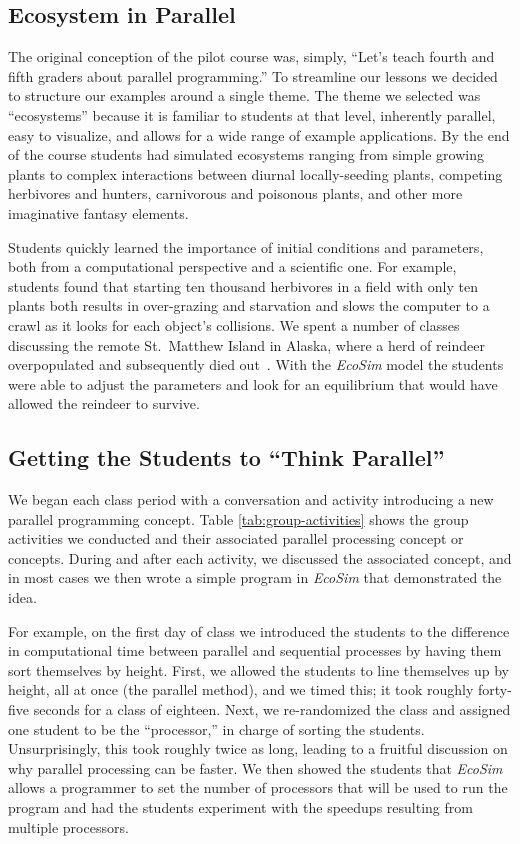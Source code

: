 \documentclass{sig-alternate}
\begin{document}
\subsection{Ecosystem in Parallel}
The original conception of the pilot course was, simply, 
``Let's teach fourth and fifth graders about parallel programming.''
To streamline our lessons we decided to structure our examples around a single theme.
The theme we selected was ``ecosystems'' because
it is familiar to students at that level,
inherently parallel, 
easy to visualize, 
and allows for a wide range of example applications.
By the end of the course students had simulated ecosystems
ranging from simple growing plants to complex interactions between 
diurnal locally-seeding plants, competing herbivores and hunters, 
carnivorous and poisonous plants, and other more imaginative fantasy elements.

Students quickly learned the importance of initial conditions and parameters, both from a 
computational perspective and a scientific one.  
For example, students found that starting 
ten thousand herbivores in a field with only ten plants
both results in over-grazing and starvation 
and slows the computer to a crawl as it looks for each object's collisions.
We spent a number of classes discussing the remote St.~Matthew Island in Alaska,
where a herd of reindeer overpopulated and subsequently died out~\cite{klein1968introduction,stMatthewIsland}.
With the \emph{EcoSim} model the students were able to adjust the parameters 
and look for an equilibrium that would have allowed the reindeer to survive.

\subsection{Getting the Students to ``Think Parallel''}
We began each class period with a conversation and activity introducing a new parallel programming concept.
Table \ref{tab:group-activities} shows the group activities we conducted and their associated
parallel processing concept or concepts.  
During and after each activity, we discussed the associated concept, 
and in most cases we then wrote a simple program in \emph{EcoSim} that demonstrated the idea.  
 
For example, on the first day of class we introduced the students to the difference in
computational time between parallel and sequential processes by having them sort themselves
by height.  First, we allowed the students to line themselves up by height, all at once (the
parallel method), and we timed this; it took roughly forty-five seconds for a class of eighteen.
Next, we re-randomized the class and assigned one student to be the ``processor,'' in charge
of sorting the students.  Unsurprisingly, this took roughly twice as long, 
leading to a fruitful discussion on why parallel processing can be faster.
We then showed the students that \emph{EcoSim} allows a programmer 
to set the number of processors that will be used to run the program
and had the students experiment with the speedups resulting from multiple processors.
\end{document}
